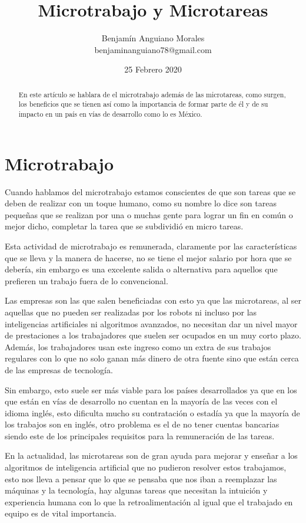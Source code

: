 \documentclass[12pt]{proc}
\title{Microtrabajo y Microtareas}
\author{Benjamín Anguiano Morales\\benjaminanguiano78@gmail.com}
\date{25 Febrero 2020}
\begin{document}
\maketitle

\begin{abstract}
En este artículo se hablara de el microtrabajo además de las microtareas, como surgen, los beneficios que se tienen así como la importancia de formar parte de él y de su impacto en un país en vías de desarrollo como lo es México.
\end{abstract}

\section{Microtrabajo}
Cuando hablamos del microtrabajo estamos conscientes de que son tareas que se deben de realizar con un toque humano, como su nombre lo dice son tareas pequeñas que se realizan por una o muchas gente para lograr un fin en común o mejor dicho, completar la tarea que se subdividió en micro tareas.

Esta actividad de microtrabajo es remunerada, claramente por las características que se lleva y la manera de hacerse, no se tiene el mejor salario por hora que se debería, sin embargo es una excelente salida o alternativa para aquellos que prefieren un trabajo fuera de lo convencional. 

Las empresas son las que salen beneficiadas con esto ya que las microtareas, al ser aquellas que no pueden ser realizadas por los robots ni incluso por las inteligencias artificiales ni algoritmos avanzados, no necesitan dar un nivel mayor de prestaciones a los trabajadores que suelen ser ocupados en un muy corto plazo.\\


Además, los trabajadores usan este ingreso como un extra de sus trabajos regulares con lo que no solo ganan más dinero de otra fuente sino que están cerca de las empresas de tecnología.

Sin embargo, esto suele ser más viable para los países desarrollados ya que en los que están en vías de desarrollo no cuentan en la mayoría de las veces con el idioma inglés, esto dificulta mucho su contratación o estadía ya que la mayoría de los trabajos son en inglés, otro problema es el de no tener cuentas bancarias siendo este de los principales requisitos para la remuneración de las tareas.

En la actualidad, las microtareas son de gran ayuda para mejorar y enseñar a los algoritmos de inteligencia artificial que no pudieron resolver estos trabajamos, esto nos lleva a pensar que lo que se pensaba que nos iban a reemplazar las máquinas y la tecnología, hay algunas tareas que necesitan la intuición y experiencia humana con lo que la retroalimentación al igual que el trabajado en equipo es de vital importancia.
\end{document}

